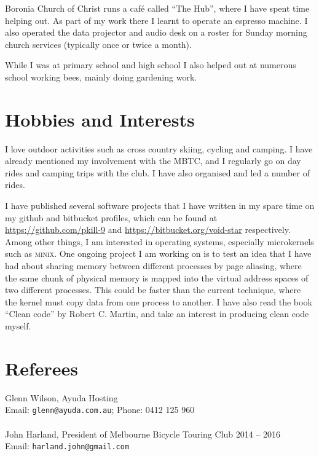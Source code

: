 \documentclass[a4paper]{article}
\begin{document}
Boronia Church of Christ runs a caf\'e called ``The Hub'', where I have
spent time helping out. As part of my work there I learnt to
operate an espresso machine. I 
also operated the data projector and audio desk on a roster for Sunday 
morning church services (typically once or twice a month).

While I was at primary school and high school I also helped out at
numerous school working bees, mainly doing gardening work.


\section{Hobbies and Interests}
I love outdoor activities such as cross country skiing, cycling
and camping. I have already mentioned my involvement with the MBTC, and I
regularly go on day rides and camping trips with the club. I have
also organised and led a number of rides.

I have published several software projects that I have written in my
spare time on my github and bitbucket profiles, which can be found at
\url{https://github.com/pkill-9} and \url{https://bitbucket.org/void-star}
respectively. Among other things, I am interested in operating systems,
especially microkernels such as \textsc{minix}. One ongoing project I am
working on is to test an idea that I have had about sharing memory between
different processes by page aliasing, where the same chunk of physical 
memory is mapped into the virtual address spaces of two different processes.
This could be faster than the current technique, where the kernel must
copy data from one process to another.
I have also read the book
``Clean code'' by Robert C. Martin, and take an interest in producing clean
code myself.




\section{Referees}
Glenn Wilson, Ayuda Hosting\\
Email: \texttt{glenn@ayuda.com.au}; Phone: 0412 125 960\\ \\
John Harland, President of Melbourne Bicycle Touring Club 2014 -- 2016\\
Email: \texttt{harland.john@gmail.com}
\end{document}
